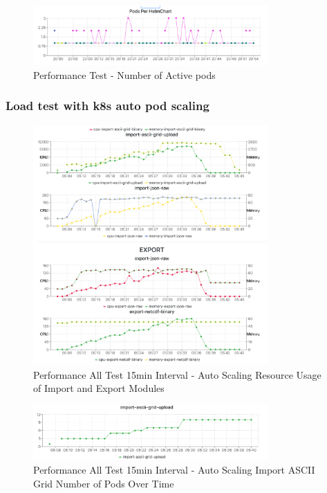 \begin{figure}[htp]
    \centering
    \includegraphics[width=0.8\textwidth]{results/obs/all/obs_all_15m_resource_pods.png}
    \caption{Performance Test - Number of Active pods}
    \label{fi:test_obs_all_15m_pods}
\end{figure}


\subsubsection{Load test with \acrfull{k8s} auto pod scaling}
\begin{figure}[htp]
    \centering
    \includegraphics[width=0.8\textwidth]{results/obs/all_auto/obs_all_auto_15m_import_export_res.png}
    \caption{Performance All Test 15min Interval - Auto Scaling Resource Usage of Import and Export Modules }
    \label{fi:obs_all_auto_15m_import_export_res}
\end{figure}

\begin{figure}[htp]
    \centering
    \includegraphics[width=0.8\textwidth]{results/obs/all_auto/obs_all_auto_15m_import_grid_pod.png}
    \caption{Performance All Test 15min Interval - Auto Scaling Import ASCII Grid Number of Pods Over Time }
    \label{fi:obs_all_auto_15m_import_grid_pod}
\end{figure}


